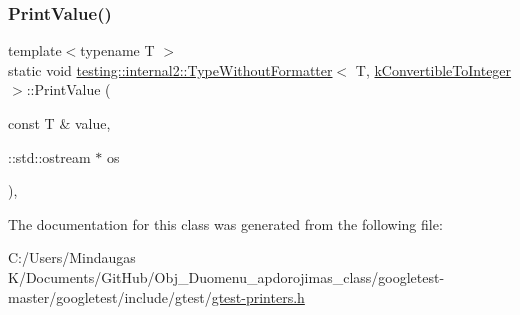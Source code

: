 \mbox{\label{classtesting_1_1internal2_1_1_type_without_formatter_3_01_t_00_01k_convertible_to_integer_01_4_ab27a411afb608e730a57d232b3f4f486}} 
\subsubsection{\texorpdfstring{PrintValue()}{PrintValue()}\hspace{0.1cm}{\footnotesize\ttfamily [3/3]}}
{\footnotesize\ttfamily template$<$typename T $>$ \\
static void \mbox{\hyperlink{classtesting_1_1internal2_1_1_type_without_formatter}{testing\+::internal2\+::\+Type\+Without\+Formatter}}$<$ T, \mbox{\hyperlink{namespacetesting_1_1internal2_aeb8161b0b3ee503347b0662d7028fd57a17045378f0cb6cac7737d414d39c720e}{k\+Convertible\+To\+Integer}} $>$\+::Print\+Value (\begin{DoxyParamCaption}\item[{const T \&}]{value,  }\item[{\+::std\+::ostream $\ast$}]{os }\end{DoxyParamCaption})\hspace{0.3cm}{\ttfamily [inline]}, {\ttfamily [static]}}



The documentation for this class was generated from the following file\+:\begin{DoxyCompactItemize}
\item 
C\+:/\+Users/\+Mindaugas K/\+Documents/\+Git\+Hub/\+Obj\+\_\+\+Duomenu\+\_\+apdorojimas\+\_\+class/googletest-\/master/googletest/include/gtest/\mbox{\hyperlink{googletest-master_2googletest_2include_2gtest_2gtest-printers_8h}{gtest-\/printers.\+h}}\end{DoxyCompactItemize}
